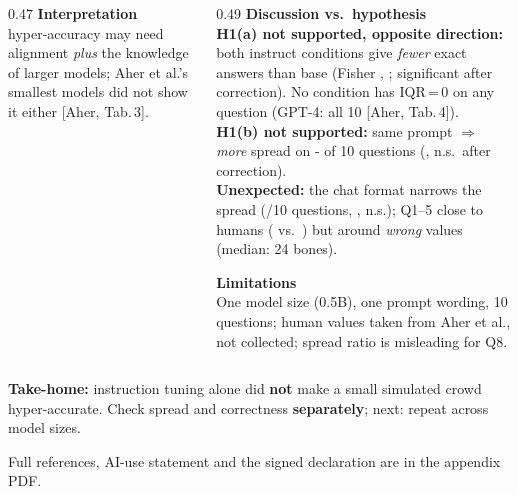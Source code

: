 \documentclass[final]{beamer}
\newcommand{\fsBody}{\fontsize{26}{32}\selectfont}
\newcommand{\fsSmall}{\fontsize{24.2}{29}\selectfont}%
\newcommand{\fsSub}{\fontsize{30}{36}\selectfont\bfseries}
\renewcommand{\cite}[1]{{\color{navy!80}[#1]}}
\begin{document}
\begin{frame}[t]
\begin{tcolorbox}[sec, title={3. Results}]
\begin{columns}[T]
\begin{column}{0.47\linewidth}
\vspace{4mm}
{\fsSub\color{navy} Interpretation}\\[2mm]
\fsBody hyper-accuracy may need alignment \emph{plus} the knowledge of larger models; Aher et al.'s smallest models did not show it either \cite{Aher, Tab.\,3}.
\end{column}
\begin{column}{0.49\linewidth}
{\fsSub\color{navy} Discussion vs.\ hypothesis}\\[2mm]
\textbf{H1(a) not supported, opposite direction:} both instruct conditions give \emph{fewer} exact answers than base (Fisher \xInstFisherP, \xChatFisherP; significant after correction). No condition has IQR\,=\,0 on any question (GPT-4: all 10 \cite{Aher, Tab.\,4}).
\\[2mm]
\textbf{H1(b) not supported:} same prompt $\Rightarrow$ \emph{more} spread on \the{}-\xInstLower\relax{} of 10 questions (\xInstWilcP, n.s.\ after correction).\\[2mm]
\textbf{Unexpected:} the chat format narrows the spread (\xChatLower{}/10 questions, \xChatWilcP, n.s.); Q1--5 close to humans (\xChatNIQRfive{} vs.\ \xHumNIQRfive) but around \emph{wrong} values (median: 24 bones).

\vspace{4mm}
{\fsSub\color{navy} Limitations}\\[2mm]
\fsSmall One model size (0.5B), one prompt wording, 10 questions; human values taken from Aher et al., not collected; spread ratio is misleading for Q8.
\end{column}
\end{columns}

\vspace{4mm}
\begin{tcolorbox}[take]
{\fsSub\color{orange!50!black} Take-home:} \fsBody instruction tuning alone did \textbf{not} make a small simulated crowd hyper-accurate. Check spread and correctness \textbf{separately}; next: repeat across model sizes.
\end{tcolorbox}

\vspace{1mm}
{\fsSmall Full references, AI-use statement and the signed declaration are in the appendix PDF.}
\end{tcolorbox}

\end{frame}
\end{document}
